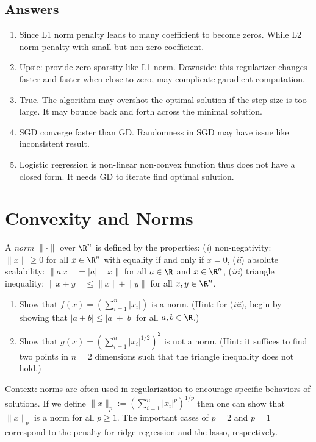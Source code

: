 \documentclass{article}
\begin{document}
\begin{sloppypar}
\begin{aprob}
    \subsection*{Answers}
    \begin{enumerate}
        \item Since L1 norm penalty leads to many coefficient to become zeros. 
        While L2 norm penalty with small but non-zero coefficient.
        \item Upsie: provide zero sparsity like L1 norm. Downside: this regularizer changes faster and faster when close to zero, may complicate garadient computation.
        \item True. The algorithm may overshot the optimal solution if the step-size is too large. It may bounce back and forth across the minimal solution.
        \item SGD converge faster than GD. Randomness in SGD may have issue like inconsistent result.
        \item Logistic regression is non-linear non-convex function thus does not have a closed form. It needs GD to iterate find optimal sulution.
    \end{enumerate}
\end{aprob}

\newpage

\section*{Convexity and Norms}

\begin{aprob}
    A \emph{norm} $\|\cdot\|$ over $\R^n$ is defined by the properties:
    (\textit{i}) non-negativity: $\|x\|\geq 0$ for all $x \in \R^n$ with equality if and only if $x=0$,
    (\textit{ii}) absolute scalability: $\|a \, x\| = |a| \, \|x\|$ for all $a \in \R$ and $x \in \R^n$, 
    (\textit{iii}) triangle inequality: $\|x+y\| \leq \|x\| + \|y\|$ for all $x,y \in \R^n$.
    \begin{enumerate}
      \item {} Show that $f(x) = \left( \sum_{i=1}^n |x_i| \right)$ is a norm. (Hint: for (\textit{iii}), begin by showing that $|a+b|\leq |a| + |b|$ for all $a,b \in \R$.)
      \item {} Show that $g(x) = \left(\sum_{i=1}^n |x_i|^{1/2}\right)^2$ is not a norm. (Hint: it suffices to find two points in $n=2$ dimensions such that the triangle inequality does not hold.)
    \end{enumerate} 
    Context: norms are often used in regularization to encourage specific behaviors of solutions. If we define  $\| x \|_p := \left( \sum_{i=1}^n |x_i|^{p} \right)^{1/p}$ then one can show that $\| x \|_p$ is a norm for all $p \geq 1$. 
    The important cases of $p=2$ and $p=1$ correspond to the penalty for ridge regression and the lasso, respectively. 
    

\end{aprob}
\end{sloppypar}
\end{document}
